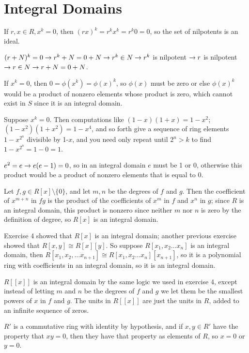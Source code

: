 \documentclass[11pt, oneside]{article}   	%
\begin{document}
\section{Integral Domains}
\be
\item \be
\item If $r, x \in R, x^k = 0$, then $(rx)^k = r^k x^k = r^k0 = 0$, so the set of nilpotents is an ideal.
\item $(r+N)^k = 0 \rightarrow r^k + N = 0 +N\rightarrow r^k \in N \rightarrow r^k$ is nilpotent $\rightarrow r$ is nilpotent $\rightarrow r \in N \rightarrow r + N = 0 + N$. 
\item If $x^k = 0$, then $0 = \phi(x^k) = \phi(x)^k$, so $\phi(x)$ must be zero or else $\phi(x)^k$ would be a product of nonzero elements whose product is zero, which cannot exist in $S$ since it is an integral domain.
\ee
\item Suppose $x^k = 0$. Then computations like $(1-x)(1 + x) = 1 -x^2$; $(1 - x^2)(1 + x^2) = 1 - x^4$, and so forth give a sequence of ring elements $1-x^{2^n}$ divisible by 1-$x$, and you need only repeat until $2^n > k$ to find $1-x^{2^n} = 1-0 = 1$. 
\item $e^2 = e \rightarrow e(e-1) = 0$, so in an integral domain $e$ must be 1 or 0, otherwise this product would be a product of nonzero elements that is equal to 0.
\item Let $f, g \in R[x]\setminus \{0\}$, and let $m, n$ be the degrees of $f$ and $g$. Then the coefficient of $x^{m+n}$ in $fg$ is the product of the coefficients of $x^m$ in $f$ and $x^n$ in $g$; since $R$ is an integral domain, this product is nonzero since neither $m$ nor $n$ is zero by the definition of degree, so $R[x]$ is an integral domain.
\item Exercise 4 showed that $R[x]$ is an integral domain; another previous exercise showed that $R[x, y] \cong R[x][y]$. So suppose $R[x_1, x_2\ldots x_n]$ is an integral domain, then $R[x_1, x_2, \ldots x_{n+1}] \cong R[x_1, x_2\ldots x_n][x_{n+1}]$, so it is a polynomial ring with coefficients in an integral domain, so it is an integral domain.
\item $R[[x]]$ is an integral domain by the same logic we used in exercise 4, except instead of letting $m$ and $n$ be the degrees of $f$ and $g$ we let them be the smallest powers of $x$ in $f$ and $g$. The units in $R[[x]]$ are just the units in $R$, added to an infinite sequence of zeros.
\item \be
\item $R'$ is a commutative ring with identity by hypothesis, and if $x, y \in R'$ have the property that $xy = 0$, then they have that property as elements of $R$, so $x=0$ or $y=0$.
\end{document}
